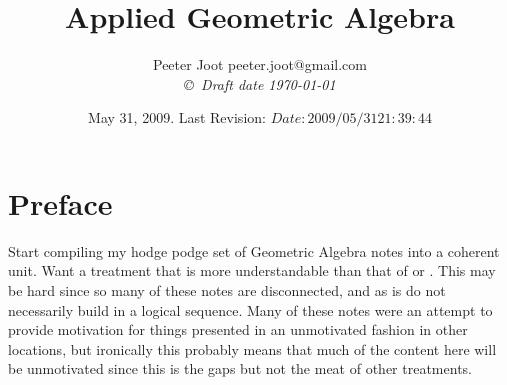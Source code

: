 \documentclass[12pt,leqno]{book}
\title{Applied Geometric Algebra}
\author{Peeter Joot  \quad peeter.joot@gmail.com \\
{\small\em \copyright \  Draft date \today }}
\date{ May 31, 2009.  Last Revision: $Date: 2009/05/31 21:39:44 $ }
\begin{document}
\maketitle
\tableofcontents
\listoffigures
\listoftables
\chapter*{Preface}\normalsize
\pagestyle{plain}

Start compiling my hodge podge set of Geometric Algebra notes into a coherent unit.  Want a treatment that is more
understandable than that of 
\cite{doran2003gap} or 
\cite{hestenes1999nfc}.
This may be hard since so many of these notes are disconnected, and as
is do not necessarily build in a logical sequence.  Many of these 
notes were an attempt to provide motivation for things presented in
an unmotivated fashion in other locations, but ironically this probably
means that much of the content here will be unmotivated since this 
is the gaps but not the meat of other treatments.

%

\pagestyle{headings}























%





\end{document}
